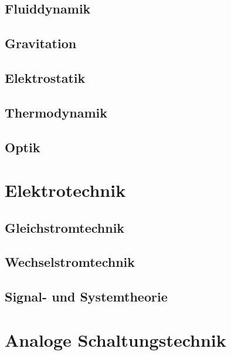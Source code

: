 \documentclass[a5paper]{report}
\begin{document}
		\chapter{Fluiddynamik}
		

		\chapter{Gravitation}
		

		\chapter{Elektrostatik}
		

		\chapter{Thermodynamik}
		

		\chapter{Optik}
		

	\part{Elektrotechnik}

		\chapter{Gleichstromtechnik}
		

		\chapter{Wechselstromtechnik}
		

		\chapter{Signal- und Systemtheorie}
		
		
		
	\part{Analoge Schaltungstechnik}
	
\end{document}
